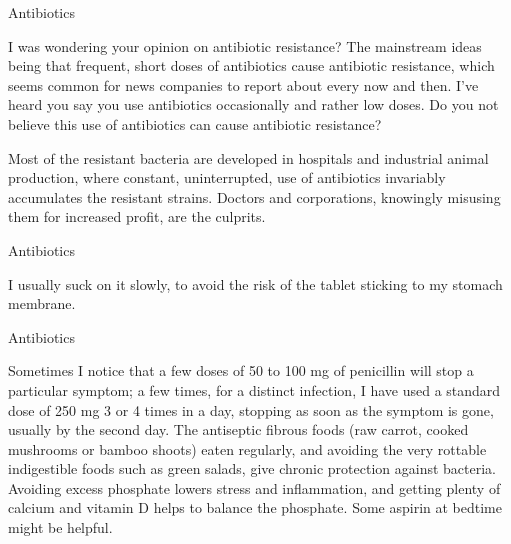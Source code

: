 \documentclass[11pt,oneside,openany,extrafontsizes]{memoir}
\begin{document}
\begin{qaexchange}{Antibiotics}

    \begin{question}
        I was wondering your opinion on antibiotic resistance? The mainstream ideas being that frequent, short doses of antibiotics cause antibiotic resistance, which seems common for news companies to report about every now and then. I've heard you say you use antibiotics occasionally and rather low doses. Do you not believe this use of antibiotics can cause antibiotic resistance?
    \end{question}

    \begin{answer}
      Most of the resistant bacteria are developed in hospitals and industrial animal production, where constant, uninterrupted, use of antibiotics invariably accumulates the resistant strains. Doctors and corporations, knowingly misusing them for increased profit, are the culprits.
    \end{answer}
\end{qaexchange}

\begin{standalonequote}{Antibiotics}

    \begin{answer}
       I usually suck on it slowly, to avoid the risk of the tablet sticking to my stomach membrane. 
    \end{answer}
\end{standalonequote}

\begin{standalonequote}{Antibiotics}

    \begin{answer}
       Sometimes I notice that a few doses of 50 to 100 mg of penicillin will stop a particular symptom; a few times, for a distinct infection, I have used a standard dose of 250 mg 3 or 4 times in a day, stopping as soon as the symptom is gone, usually by the second day. The antiseptic fibrous foods (raw carrot, cooked mushrooms or bamboo shoots) eaten regularly, and avoiding the very rottable indigestible foods such as green salads, give chronic protection against bacteria. Avoiding excess phosphate lowers stress and inflammation, and getting plenty of calcium and vitamin D helps to balance the phosphate. Some aspirin at bedtime might be helpful. 
    \end{answer}
\end{standalonequote}
\end{document}
